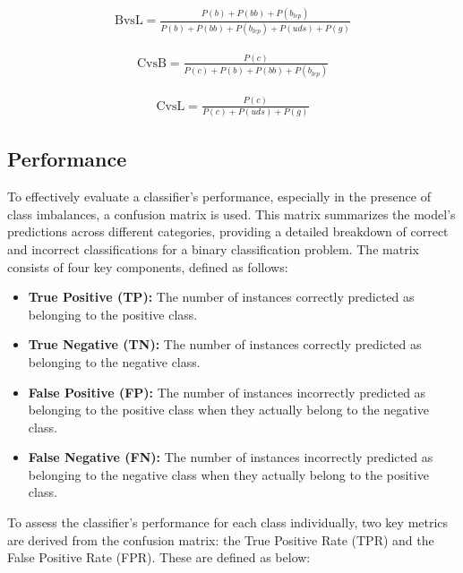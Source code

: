 \begin{equation}
\begin{split}
\text{BvsL} = \frac{P(b)+P(bb)+P(b_{lep})}
                   {P(b)+P(bb)+P(b_{lep})+P(uds)+P(g)}
\end{split}
\label{eq:bvsl}
\end{equation}

\begin{equation}
\begin{split}
\text{CvsB} = \frac{P(c)}
                    {P(c)+P(b)+P(bb)+P(b_{lep})}
\end{split}
\label{eq:cvsb}
\end{equation}


\begin{equation}
\begin{split}
\text{CvsL} = \frac{P(c)}
                    {P(c)+P(uds)+P(g)}
\end{split}
\label{eq:cvsl}
\end{equation}

\subsection{Performance}

To effectively evaluate a classifier’s performance, especially in the presence of class imbalances, a confusion matrix is used. This matrix summarizes the model’s predictions across different categories, providing a detailed breakdown of correct and incorrect classifications for a binary classification problem. The matrix consists of four key components, defined as follows:

\begin{itemize}
    \item \textbf{True Positive (TP):} The number of instances correctly predicted as belonging to the positive class.
    \item \textbf{True Negative (TN):} The number of instances correctly predicted as belonging to the negative class.
    \item \textbf{False Positive (FP):} The number of instances incorrectly predicted as belonging to the positive class when they actually belong to the negative class.
    \item \textbf{False Negative (FN):} The number of instances incorrectly predicted as belonging to the negative class when they actually belong to the positive class.
\end{itemize}

To assess the classifier’s performance for each class individually, two key metrics are derived from the confusion matrix: the True Positive Rate (TPR) and the False Positive Rate (FPR). These are defined as below:


